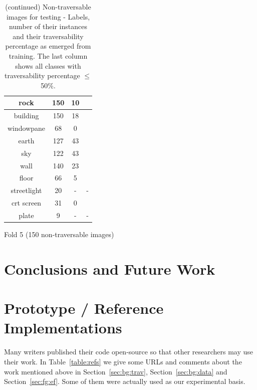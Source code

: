 \documentclass[12pt,a4paper,table,dvipsnames,tikz]{report}
\newcommand{\acronym}{\MakeUppercase}
\newcommand{\bl}[1]{{\hypersetup{linkcolor=blue}#1}}
\begin{document}
\begin{table}[h!]
\begin{subtable}[h!]{\textwidth}
\begin{tabular}{|c|c|c|c|}
				rock & 150 & 10 & \checkmark\\
				\hline
				building & 150 & 18 & \checkmark\\
				\hline
				windowpane & 68 & 0 & \checkmark\\
				\hline
				\rowcolor{earth}
				earth & 127 & 43 & \checkmark\\
				\hline
				\rowcolor{sky}
				sky & 122 & 43 & \checkmark\\
				\hline
				wall & 140 & 23 & \checkmark\\
				\hline
				floor & 66 & 5 & \checkmark\\
				\hline
				streetlight & 20 & - & -\\
				\hline
				crt screen & 31 & 0 & \checkmark\\
				\hline
				plate & 9 & - & -\\
				\hline
			\end{tabular}
			\caption{Fold 5 (150 non-traversable images)}
			\label{table:obst.f5}
		\end{subtable}
		\caption{(continued) Non-traversable images for testing - Labels, number of their instances 
			and their traversability percentage as emerged from training. The last column shows all 
			classes with traversability percentage $\le$ 50\%.}
	\end{table}
	
	

	
	
	\chapter{Conclusions and Future Work}
	\label{sec:concl}
	
	
	\appendix
	\chapter{Prototype / Reference Implementations}
	\label{app:impl}
	
	Many writers published their code open-source so that other researchers may 
	use their work. In Table~\bl{\ref{table:refs}} we give some \acronym{url}s and 
	comments about the work mentioned above in Section~\ref{sec:bg:trav}, 
	Section~\ref{sec:bg:data} and Section~\ref{sec:fg:ef}. Some of them were 
	actually used as our experimental basis.
	\\
	
	
\end{document}
